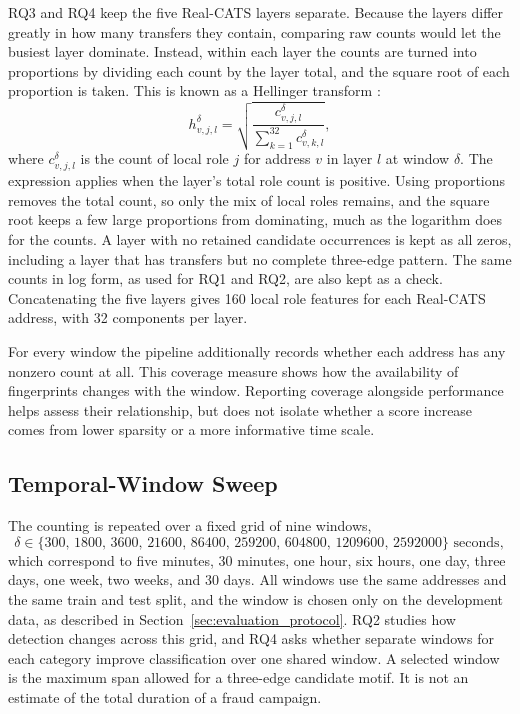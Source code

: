 \documentclass{thesisclass}
\begin{document}
RQ3 and RQ4 keep the five Real-CATS layers separate. Because the layers differ greatly
in how many transfers they contain, comparing raw counts would let the busiest
layer dominate. Instead, within each layer the counts are turned into proportions by dividing each
count by the layer total, and the square root of each proportion is taken. This is
known as a Hellinger transform \citep{legendre2001transformations}:
\[
    h_{v,j,l}^{\delta}
      = \sqrt{\frac{c_{v,j,l}^{\delta}}{\sum_{k=1}^{32}c_{v,k,l}^{\delta}}},
\]
where $c_{v,j,l}^{\delta}$ is the count of local role $j$ for address $v$ in
layer $l$ at window $\delta$. The expression applies when the layer's total
role count is positive. Using proportions removes the total count, so only
the mix of local roles remains, and
the square root keeps a few large proportions from dominating, much as the
logarithm does for the counts. A layer with no retained candidate occurrences is
kept as all zeros, including a layer that has transfers but no complete
three-edge pattern. The
same counts in log form, as used for RQ1 and RQ2, are also kept as a check.
Concatenating the five layers gives 160 local role features for each Real-CATS
address, with 32 components per layer.

For every window the pipeline additionally records whether each address has any
nonzero count at all. This coverage measure shows how the availability of
fingerprints changes with the window. Reporting coverage alongside performance
helps assess their relationship, but does not isolate whether a score increase
comes from lower sparsity or a more informative time scale.

\subsection{Temporal-Window Sweep}
\label{sec:temporal_window_sweep}

The counting is repeated over a fixed grid of nine windows,
\[
    \delta \in \{300,\,1800,\,3600,\,21600,\,86400,\,259200,\,604800,\,
                  1209600,\,2592000\}
    \text{ seconds},
\]
which correspond to five minutes, 30 minutes, one hour, six hours, one day, three
days, one week, two weeks, and 30 days. All windows use the same addresses and
the same train and test split, and the window is chosen only on the development
data, as described in Section~\ref{sec:evaluation_protocol}. RQ2 studies how
detection changes across this grid, and RQ4 asks whether separate windows for
each category improve classification over one shared window. A selected window
is the maximum span allowed for a three-edge candidate motif. It is not an estimate of the
total duration of a fraud campaign.
\end{document}
